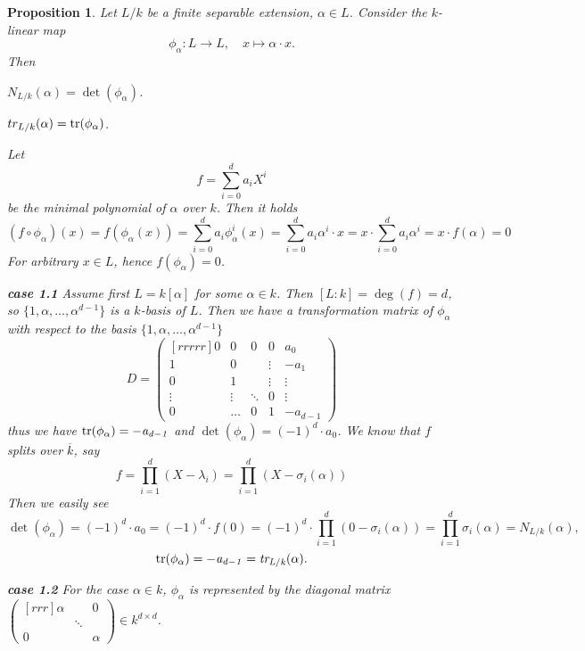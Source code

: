 \documentclass[11pt]{book}
\newtheorem{proposition}[theorem]{Proposition}
\theoremstyle{nonumberbreak}
\newenvironment{pr}[1][]{\ifthenelse{\equal{#1}{}}{\proof}{\proof[#1]}\rm}{\endproof}
\begin{document}
\begin{spacing}{1.3}
\begin{proposition} %
Let $L/k$ be a finite separable extension, $\alpha \in L$. Consider the $k$-linear map
$$ \phi_{\alpha}: L \longrightarrow L, \quad x \mapsto \alpha \cdot x.$$
Then
\begin{compactenum}
\item $N_{L/k}(\alpha)=\det(\phi_{\alpha})$.
\item $tr_{L/k}(\alpha)=\rm{tr}\it(\phi_{\alpha})$.
\end{compactenum}
\begin{pr}
Let $$f=\sum_{i=0}^d a_i X^{i}$$ be the minimal polynomial of $\alpha$ over $k$. Then it holds
$$\left(f \circ \phi_{\alpha}\right)(x)=f\left(\phi_{\alpha}(x)\right)=\sum_{i=0}^d a_i \phi_{\alpha}^{i}(x)=\sum_{i=0}^d a_i \alpha^{i} \cdot x = x \cdot \sum_{i=0}^d a_i \alpha^{i} = x \cdot f(\alpha)=0$$
For arbitrary $x \in L$, hence $f(\phi_{\alpha})=0$.
\begin{compactitem}
\item[\textbf{case 1.1}] Assume first $L=k[\alpha]$ for some $\alpha \in k$. Then $[L:k]= \deg(f)=d$, so $\{1, \alpha, \ldots, \alpha^{d-1}\}$ is a $k$-basis of $L$. Then we have a transformation matrix of $\phi_{\alpha}$ with respect to the basis $\{1, \alpha, \ldots, \alpha^{d-1}\}$\\
$$D=\begin{pmatrix}[rrrrr] 0 & 0 & 0 & 0 & a_0 \\ 1 & 0 && \vdots & -a_1 \\ 0 & 1 & & \vdots &  \vdots \\ \vdots & \vdots & \ddots & 0 & \vdots \\ 0 &  \ldots & 0 & 1 & -a_{d-1} \end{pmatrix}$$
thus we have $\rm{tr}\it(\phi_{\alpha})=-a_{d-1}$ and $\det(\phi_{\alpha})=(-1)^d \cdot a_0$.
We know that $f$ splits over $\overline{k}$, say $$f=\prod_{i=1}^d (X-\lambda_i)=\prod_{i=1}^d \left(X-\sigma_i(\alpha)\right)$$
Then we easily see
$$\det(\phi_{\alpha})=(-1)^d \cdot a_0=(-1)^d \cdot f(0)=(-1)^d \cdot \prod_{i=1}^d \left(0-\sigma_i(\alpha)\right)=\prod_{i=1}^d \sigma_i(\alpha)=N_{L/k}(\alpha),$$
$$\rm{tr}\it(\phi_{\alpha})=-a_{d-1}=tr_{L/k}(\alpha).$$
\item[\textbf{case 1.2}] For the case $\alpha \in k$, $\phi_{\alpha}$ is represented by the diagonal matrix $\begin{pmatrix}[rrr] \alpha & & 0 \\ & \ddots & \\ 0 & & \alpha \end{pmatrix} \in k^{d \times d}$.

\end{compactitem}
\end{pr}
\end{proposition}
\end{spacing}
\end{document}
